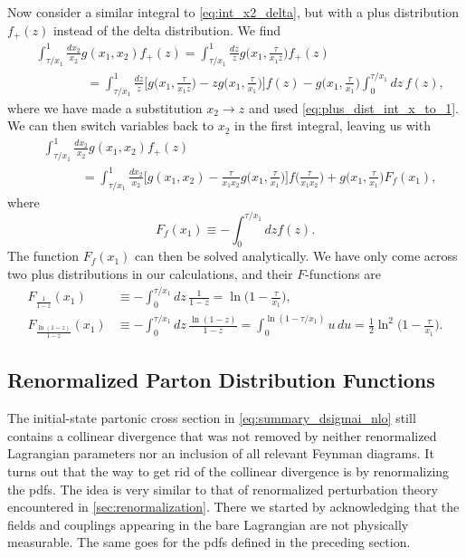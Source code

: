 Now consider a similar integral to \cref{eq:int_x2_delta}, but with a plus distribution $f_+(z)$ instead of the delta distribution. We find
\begin{align}
    &\int_{\tau/x_1}^1 \frac{dx_2}{x_2} g(x_1,x_2) f_+(z) = \int_{\tau/x_1}^1 \frac{dz}{z} g\biggl(x_1, \frac{\tau}{x_1 z}\biggr) f_+(z)
    \nonumber \\ &\hspace{4em}
    = \int_{\tau/x_1}^1 \frac{dz}{z} \Biggl[ g\biggl(x_1, \frac{\tau}{x_1 z}\biggr) - z g\biggl(x_1, \frac{\tau}{x_1}\biggr) \Biggr] f(z)
    - g\biggl(x_1, \frac{\tau}{x_1}\biggr) \int_0^{\tau/x_1} dz \, f(z),
\end{align}
where we have made a substitution $x_2 \to z$ and used \cref{eq:plus_dist_int_x_to_1}.
We can then switch variables back to $x_2$ in the first integral, leaving us with
\begin{equation}\label{eq:int_x2_plus}
\begin{split}
    &\int_{\tau/x_1}^1 \frac{dx_2}{x_2} g(x_1,x_2) f_+(z)
    \\ &\hspace{3em}
    = \int_{\tau/x_1}^1 \frac{dx_2}{x_2} \Biggl[ g(x_1,x_2) - \frac{\tau}{x_1 x_2} g\biggl(x_1, \frac{\tau}{x_1}\biggr) \Biggr] f\biggl(\frac{\tau}{x_1 x_2}\biggr) + g\biggl(x_1, \frac{\tau}{x_1}\biggr) F_f(x_1),
\end{split}
\end{equation}
where
\begin{equation}
    F_f(x_1) \equiv - \int_0^{\tau/x_1} dz f(z).
\end{equation}
The function $F_f(x_1)$ can then be solved analytically. We have only come across two plus distributions in our calculations, and their $F$-functions are
\begin{subequations}
\begin{align}
    F_{\frac{1}{1-z}}(x_1) &\equiv -\int_0^{\tau/x_1} dz \, \frac{1}{1-z} = \ln\biggl(1 - \frac{\tau}{x_1}\biggr),
    \\
    F_{\frac{\ln(1-z)}{1-z}}(x_1) &\equiv -\int_0^{\tau/x_1} dz \, \frac{\ln(1-z)}{1-z} = \int_0^{\ln(1-\tau/x_1)} u \, du = \frac{1}{2} \ln^2\biggl(1 - \frac{\tau}{x_1}\biggr).
\end{align}
\end{subequations}




\subsection{Renormalized Parton Distribution Functions}
The initial-state partonic cross section in \cref{eq:summary_dsigmai_nlo} still contains a collinear divergence that was not removed by neither renormalized Lagrangian parameters nor an inclusion of all relevant Feynman diagrams.
It turns out that the way to get rid of the collinear divergence is by renormalizing the \glspl{pdf}.
The idea is very similar to that of renormalized perturbation theory encountered in \cref{sec:renormalization}.
There we started by acknowledging that the fields and couplings appearing in the bare Lagrangian are not physically measurable.
The same goes for the \glspl{pdf} defined in the preceding section.

